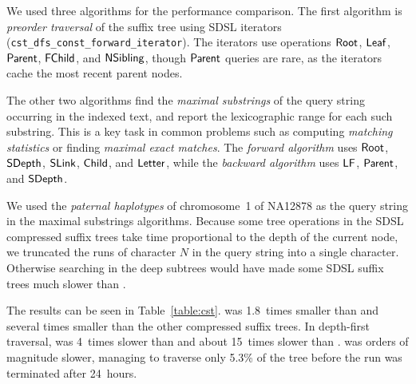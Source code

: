 We used three algorithms for the performance comparison. The first algorithm is
\emph{preorder traversal} of the suffix tree using SDSL iterators
(\texttt{cst\_dfs\_const\_forward\_iterator}). The iterators use operations
$\mathsf{Root}$, $\mathsf{Leaf}$, $\mathsf{Parent}$, $\mathsf{FChild}$, and $\mathsf{NSibling}$, though $\mathsf{Parent}$
queries are rare, as the iterators cache the most recent parent nodes.

The other two algorithms find the \emph{maximal substrings} of the query string
occurring in the indexed text, and report the lexicographic range for each such
substring. This is a key task in common problems such as computing
\emph{matching statistics} \cite{Chang1994} or finding \emph{maximal exact matches}.
The \emph{forward algorithm} uses $\mathsf{Root}$, $\mathsf{SDepth}$, $\mathsf{SLink}$, $\mathsf{Child}$,
and $\mathsf{Letter}$, while the \emph{backward algorithm} \cite{Ohlebusch2010a} uses
$\mathsf{LF}$, $\mathsf{Parent}$, and $\mathsf{SDepth}$.

We used the \emph{paternal haplotypes} of chromosome~1 of NA12878 as the
query string in the maximal substrings algorithms. Because some tree operations
in the SDSL compressed suffix trees take time proportional to the depth of the
current node, we truncated the runs of character $N$ in the query string into
a single character. Otherwise searching in the deep subtrees would have
made some SDSL suffix trees much slower than \RCST.

The results can be seen in Table~\ref{table:cst}. \RCST{} was 1.8~times smaller
than \FCST{} and several times smaller than the other compressed suffix trees.
In depth-first traversal, \RCST{} was 4~times slower than \CSTnpr{} and
about 15~times slower than \CSTsada. \FCST{} was orders of magnitude slower,
managing to traverse only 5.3\% of the tree before the run was terminated after
24~hours.


